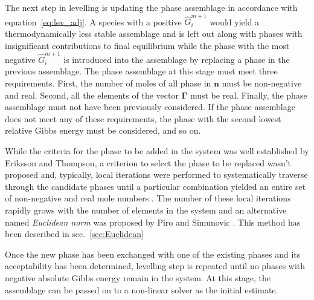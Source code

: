 	The next step in levelling is updating the phase assemblage in accordance with equation~\eqref{eq:lev_adj}. A  species with a positive $\hat{G}_i^{m+1}$ would yield a thermodynamically less stable assemblage and is left out along with phases with insignificant contributions to final equilibrium while the phase with the most negative $\hat{G}_i^{m+1}$ is introduced into the assemblage by replacing a phase in the previous assemblage. The phase assemblage at this stage must meet three requirements. First, the number of moles of all phase in $\mathbf{n}$ must be non-negative and real. Second, all the elements of the vector $\boldsymbol{\Gamma}$ must be real. Finally, the phase assemblage must not have been previously considered. If the phase assemblage does not meet any of these requirements, the phase with the second lowest relative Gibbs energy must be considered, and so on.

	While the criteria for the phase to be added in the system was well established by Eriksson and Thompson, a criterion to select the phase to be replaced wasn't proposed and, typically, local iterations were performed to systematically traverse through the candidate phases until a particular combination yielded an entire set of non-negative and real mole numbers \cite{Eriksson89}. The number of these local iterations rapidly grows with the number of elements in the system and an alternative named \emph{Euclidean norm} was proposed by Piro and Simunovic \cite{Piro12a}. This method has been described in sec.~\ref{sec:Euclidean}

	Once the new phase has been exchanged with one of the existing phases and its acceptability has been determined, levelling step is repeated until no phases with negative absolute Gibbs energy remain in the system. At this stage, the assemblage can be passed on to a non-linear solver as the initial estimate.


